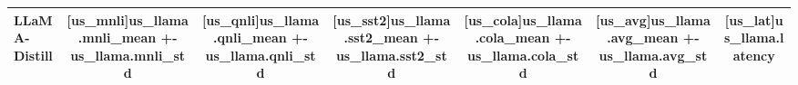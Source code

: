 \begin{table}[htbp]
\begin{threeparttable}
\begin{tabular}{lcccccc}
LLaMA-Distill    & [us_mnli]{us_llama.mnli_mean +- us_llama.mnli_std}     & [us_qnli]{us_llama.qnli_mean +- us_llama.qnli_std}     & [us_sst2]{us_llama.sst2_mean +- us_llama.sst2_std}     & [us_cola]{us_llama.cola_mean +- us_llama.cola_std}     & [us_avg]{us_llama.avg_mean +- us_llama.avg_std}     & [us_lat]{us_llama.latency} \\
\bottomrule
\end{tabular}
\end{threeparttable}
\end{table}
